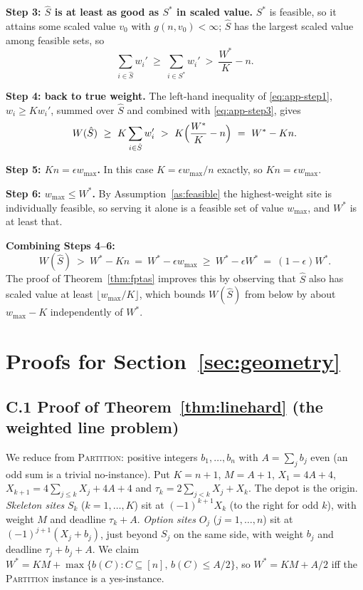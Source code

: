 \documentclass[pdflatex,sn-mathphys-ay]{sn-jnl}
\theoremstyle{thmstyleone}
\theoremstyle{thmstyletwo}
\theoremstyle{thmstylethree}
\begin{document}
\begin{appendices}
\textbf{Step 3: $\hat S$ is at least as good as $S^\ast$ in scaled value.}
$S^\ast$ is feasible, so it attains some scaled value $v_0$ with
$g(n,v_0)<\infty$; $\hat S$ has the largest scaled value among feasible
sets, so
\begin{equation}\label{eq:app-step3}
\sum_{i\in\hat S}w_i'\ \ge\ \sum_{i\in S^\ast}w_i'\ >\ \frac{W^\ast}{K}-n.
\end{equation}

\textbf{Step 4: back to true weight.} The left-hand inequality of
\eqref{eq:app-step1}, $w_i\ge Kw_i'$, summed over $\hat S$ and combined
with \eqref{eq:app-step3}, gives
\begin{equation}\label{eq:app-step4}
W(\hat S)\ \ge\ K\sum_{i\in\hat S}w_i'\ >\ K\Bigl(\frac{W^\ast}{K}-n\Bigr)
\ =\ W^\ast-Kn.
\end{equation}

\textbf{Step 5: $Kn=\epsilon w_{\max}$.} In this case
$K=\epsilon w_{\max}/n$ exactly, so $Kn=\epsilon w_{\max}$.

\textbf{Step 6: $w_{\max}\le W^\ast$.} By Assumption~\ref{as:feasible} the
highest-weight site is individually feasible, so serving it alone is a
feasible set of value $w_{\max}$, and $W^\ast$ is at least that.

\textbf{Combining Steps 4--6:}
\[
W(\hat S)\ >\ W^\ast-Kn\ =\ W^\ast-\epsilon w_{\max}\ \ge\ W^\ast-\epsilon W^\ast
\ =\ (1-\epsilon)W^\ast .
\]
The proof of Theorem~\ref{thm:fptas} improves this by observing that
$\hat S$ also has scaled value at least $\lfloor w_{\max}/K\rfloor$, which
bounds $W(\hat S)$ from below by about $w_{\max}-K$ independently of
$W^\ast$.

\section{Proofs for Section~\ref{sec:geometry}}\label{app:geometry}

\subsection*{C.1 Proof of Theorem~\ref{thm:linehard} (the weighted line problem)}

We reduce from \textsc{Partition}: positive integers $b_1,\dots,b_n$ with
$A=\sum_jb_j$ even (an odd sum is a trivial no-instance). Put $K=n+1$,
$M=A+1$, $X_1=4A+4$, $X_{k+1}=4\sum_{j\le k}X_j+4A+4$ and
$\tau_k=2\sum_{j<k}X_j+X_k$. The depot is the origin. \emph{Skeleton
sites} $S_k$ ($k=1,\dots,K$) sit at $(-1)^{k+1}X_k$ (to the right for odd
$k$), with weight $M$ and deadline $\tau_k+A$. \emph{Option sites} $O_j$
($j=1,\dots,n$) sit at $(-1)^{j+1}(X_j+b_j)$, just beyond $S_j$ on the same
side, with weight $b_j$ and deadline $\tau_j+b_j+A$. We claim
$W^\ast=KM+\max\{b(C):C\subseteq[n],\,b(C)\le A/2\}$, so $W^\ast=KM+A/2$
iff the \textsc{Partition} instance is a yes-instance.


\end{appendices}
\end{document}
